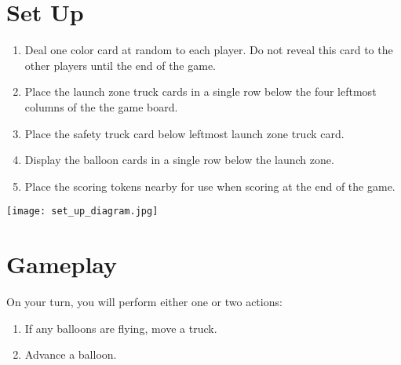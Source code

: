 \documentclass[a6paper, 11pt, parskip=half, DIV=15]{scrartcl}
\begin{document}
\newpage
\enlargethispage{1.75\baselineskip}
\section*{Set Up}
\begin{enumerate}

  \item Deal one color card at random to each player.
  Do not reveal this card to the other players until the end of the game.

 
  \item Place the launch zone truck cards in a single row below the four leftmost columns of the the game board.%

  \item Place the safety truck card below leftmost launch zone truck card.


  \item Display the balloon cards in a single row below the launch zone. 

  \item Place the scoring tokens nearby for use when scoring at the end of the game.
\end{enumerate}
\begin{center}
\texttt{[image: set\_up\_diagram.jpg]}
\end{center}

\newpage
\enlargethispage{1.75\baselineskip}
\section*{Gameplay}
On your turn, you will perform either one or two actions:
\begin{enumerate}[nosep]
  \item If any balloons are flying, move a truck.
  \item Advance a balloon.
\end{enumerate}
\end{document}
